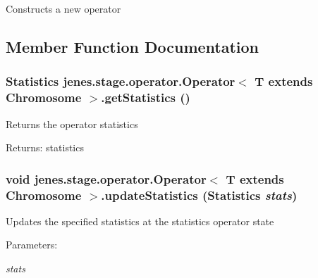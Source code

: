 Constructs a new operator 

\subsection{Member Function Documentation}
\hypertarget{classjenes_1_1stage_1_1operator_1_1_operator_3_01_t_01extends_01_chromosome_01_4_bf64e7c4d53509dd770fa09ca9cf377d}{
\subsubsection[getStatistics]{\setlength{\rightskip}{0pt plus 5cm}Statistics jenes.stage.operator.Operator$<$ T extends Chromosome $>$.getStatistics ()}}
\label{classjenes_1_1stage_1_1operator_1_1_operator_3_01_t_01extends_01_chromosome_01_4_bf64e7c4d53509dd770fa09ca9cf377d}


Returns the operator statistics

\begin{Desc}
\item[Returns:]statistics \end{Desc}
\hypertarget{classjenes_1_1stage_1_1operator_1_1_operator_3_01_t_01extends_01_chromosome_01_4_11ffd92acef6de663583899707cbbab9}{
\subsubsection[updateStatistics]{\setlength{\rightskip}{0pt plus 5cm}void jenes.stage.operator.Operator$<$ T extends Chromosome $>$.updateStatistics (Statistics {\em stats})}}
\label{classjenes_1_1stage_1_1operator_1_1_operator_3_01_t_01extends_01_chromosome_01_4_11ffd92acef6de663583899707cbbab9}


Updates the specified statistics at the statistics operator state 

\begin{Desc}
\item[Parameters:]
\begin{description}
\item[{\em stats}]\end{description}
\end{Desc}


